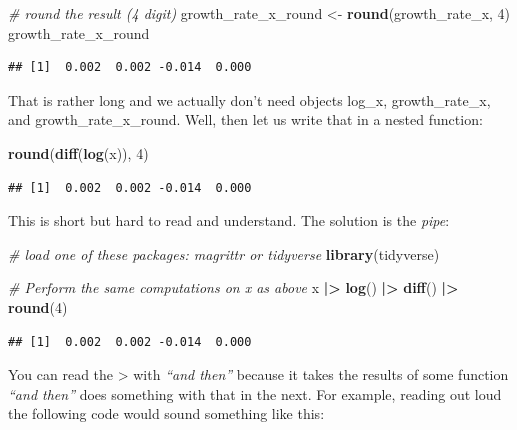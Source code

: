 \documentclass[
  12pt,
  oneside]{book}
\newenvironment{Shaded}{\begin{snugshade}}{\end{snugshade}}
\newcommand{\CommentTok}[1]{\textcolor[rgb]{0.56,0.35,0.01}{\textit{#1}}}
\newcommand{\DecValTok}[1]{\textcolor[rgb]{0.00,0.00,0.81}{#1}}
\newcommand{\FunctionTok}[1]{\textcolor[rgb]{0.13,0.29,0.53}{\textbf{#1}}}
\newcommand{\NormalTok}[1]{#1}
\newcommand{\OtherTok}[1]{\textcolor[rgb]{0.56,0.35,0.01}{#1}}
\newcommand{\SpecialCharTok}[1]{\textcolor[rgb]{0.81,0.36,0.00}{\textbf{#1}}}
\theoremstyle{definition}
\theoremstyle{definition}
\theoremstyle{definition}
\theoremstyle{definition}
\theoremstyle{remark}
\begin{document}
\begin{Shaded}
\begin{Highlighting}[]
\CommentTok{\# round the result (4 digit)}
\NormalTok{growth\_rate\_x\_round }\OtherTok{\textless{}{-}} \FunctionTok{round}\NormalTok{(growth\_rate\_x, }\DecValTok{4}\NormalTok{)}
\NormalTok{growth\_rate\_x\_round }
\end{Highlighting}
\end{Shaded}

\begin{verbatim}
## [1]  0.002  0.002 -0.014  0.000
\end{verbatim}

That is rather long and we actually don't need objects log\_x, growth\_rate\_x, and growth\_rate\_x\_round.
Well, then let us write that in a nested function:

\begin{Shaded}
\begin{Highlighting}[]
\FunctionTok{round}\NormalTok{(}\FunctionTok{diff}\NormalTok{(}\FunctionTok{log}\NormalTok{(x)), }\DecValTok{4}\NormalTok{)}
\end{Highlighting}
\end{Shaded}

\begin{verbatim}
## [1]  0.002  0.002 -0.014  0.000
\end{verbatim}

This is short but hard to read and understand. The solution is the \emph{pipe}:

\begin{Shaded}
\begin{Highlighting}[]
\CommentTok{\# load one of these packages: \textasciigrave{}magrittr\textasciigrave{} or \textasciigrave{}tidyverse\textasciigrave{}}
\FunctionTok{library}\NormalTok{(tidyverse)}

\CommentTok{\# Perform the same computations on \textasciigrave{}x\textasciigrave{} as above}
\NormalTok{x }\SpecialCharTok{|\textgreater{}} 
  \FunctionTok{log}\NormalTok{() }\SpecialCharTok{|\textgreater{}}
  \FunctionTok{diff}\NormalTok{() }\SpecialCharTok{|\textgreater{}}
  \FunctionTok{round}\NormalTok{(}\DecValTok{4}\NormalTok{)}
\end{Highlighting}
\end{Shaded}

\begin{verbatim}
## [1]  0.002  0.002 -0.014  0.000
\end{verbatim}

You can read the \textbar\textgreater{} with \emph{``and then''} because it takes the results of some function \emph{``and then''} does something with that in the next.
For example, reading out loud the following code would sound something like this:
\end{document}
